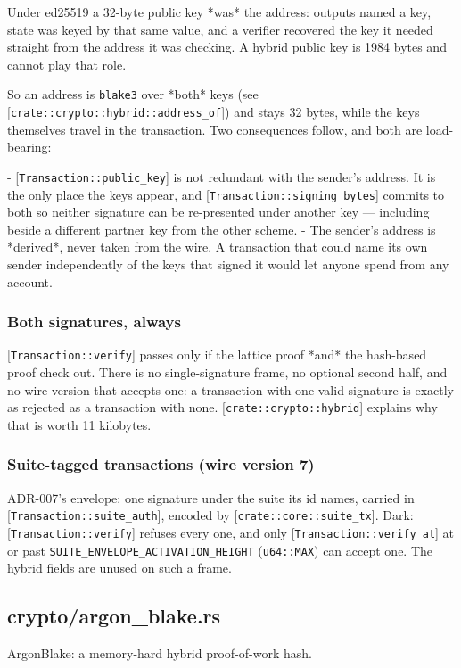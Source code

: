 \documentclass[11pt,a4paper]{article}
\begin{document}
Under ed25519 a 32-byte public key *was* the address: outputs named a key,
state was keyed by that same value, and a verifier recovered the key it
needed straight from the address it was checking. A hybrid public key is
1984 bytes and cannot play that role.

So an address is \texttt{blake3} over *both* keys (see
[\texttt{crate::crypto::hybrid::address\_of}]) and stays 32 bytes, while the keys
themselves travel in the transaction. Two consequences follow, and both are
load-bearing:

- [\texttt{Transaction::public\_key}] is not redundant with the sender's address. It
  is the only place the keys appear, and [\texttt{Transaction::signing\_bytes}]
  commits to both so neither signature can be re-presented under another
  key — including beside a different partner key from the other scheme.
- The sender's address is *derived*, never taken from the wire. A transaction
  that could name its own sender independently of the keys that signed it
  would let anyone spend from any account.

\subsubsection{Both signatures, always}

[\texttt{Transaction::verify}] passes only if the lattice proof *and* the
hash-based proof check out. There is no single-signature frame, no optional
second half, and no wire version that accepts one: a transaction with one
valid signature is exactly as rejected as a transaction with none.
[\texttt{crate::crypto::hybrid}] explains why that is worth 11 kilobytes.

\subsubsection{Suite-tagged transactions (wire version 7)}

ADR-007's envelope: one signature under the suite its id names, carried in
[\texttt{Transaction::suite\_auth}], encoded by [\texttt{crate::core::suite\_tx}]. Dark:
[\texttt{Transaction::verify}] refuses every one, and only
[\texttt{Transaction::verify\_at}] at or past \texttt{SUITE\_ENVELOPE\_ACTIVATION\_HEIGHT}
(\texttt{u64::MAX}) can accept one. The hybrid fields are unused on such a frame.

\subsection{crypto/argon\_blake.rs}
ArgonBlake: a memory-hard hybrid proof-of-work hash.
\end{document}
